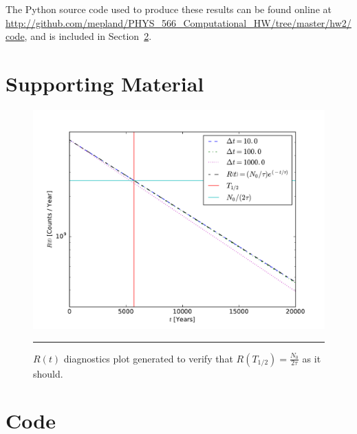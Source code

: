 \documentclass[notitlepage,aps,prd,nofootinbib]{revtex4-1}
\begin{document}
The Python source code used to produce these results can be found online at \url{http://github.com/mepland/PHYS_566_Computational_HW/tree/master/hw2/code}, and is included in Section~\ref{sec:code}.

\clearpage
\section{Supporting Material}
\label{sec:Supporting_Material}

\begin{figure}[!htbc]
  \centering
  \includegraphics[width=.70\textwidth]{output/diagnostic_plot.pdf}
	{\par\nobreak\rule[9pt]{35em}{0.5pt}\vspace{-5mm}}
	\caption{$R\left(t\right)$ diagnostics plot generated to verify that $R\left(T_{1/2}\right) = \frac{N_{0}}{2\tau}$ as it should.}
	\label{fig:diagnostic_plot}
\end{figure}

\clearpage


\clearpage
\section{Code}
\label{sec:code}


\end{document}
